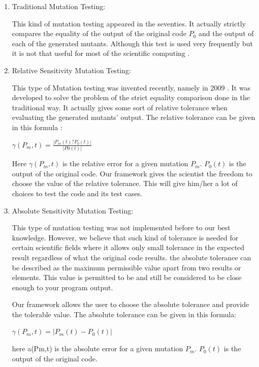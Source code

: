 \documentclass{acm_proc_article-sp}
\begin{document}
\begin{enumerate}
\item Traditional Mutation Testing:

This kind of mutation testing appeared in the seventies. It actually strictly compares the equality of the output of the original code $P_0$ and the output of each of the generated mutants. Although this test is used very frequently but it is not that useful for most of the scientific computing \cite{a2}.

\item Relative Sensitivity Mutation Testing:

This type of Mutation testing was invented recently, namely in 2009 \cite{a2}. It was developed to solve the problem of the strict equality comparison done in the traditional way. It actually gives some sort of relative tolerance when evaluating the generated mutants' output. The relative tolerance can be given in this formula \cite{a2}:\\

\begin{center}
$\gamma(P_m, t) = \frac{|P_m(t) ? P_0(t)|}{|P0 (t)|}$
\end{center}

Here $\gamma(P_m,t)$ is the relative error for a given mutation $P_m$. $P_0(t)$ is the output of the original code. Our framework gives the scientist the freedom to choose the value of the relative tolerance. This will give him/her a lot of choices to test the code and its test cases.

\item Absolute Sensitivity Mutation Testing:

This type of mutation testing was not implemented before to our best knowledge. However, we believe that such kind of tolerance is needed for certain scientific fields where it allows only small tolerance in the expected result regardless of what the original code results. the absolute tolerance can be described as the maximum permissible value apart from two results or elements. This value is permitted to be and still be considered to be close enough to your program output.

Our framework allows the user to choose the absolute tolerance and provide the tolerable value. The absolute tolerance can be given in this formula:

\begin{center}
$\gamma(P_m,t) = |P_m(t) - P_0(t)|$
\end{center}

here a(Pm,t) is the absolute error for a given mutation $P_m$. $P_0(t)$ is the output of the original code. 

\end{enumerate}
\end{document}
